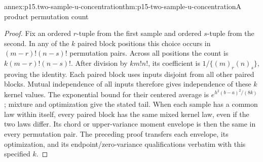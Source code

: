 \begin{annexitem}{annex:p15.two-sample-u-concentration}{thm:p15-two-sample-u-concentration}{A product permutation count}
\begin{proof}
Fix an ordered \(r\)-tuple from the first sample and ordered \(s\)-tuple
from the second. In any of the \(k\) paired block positions this choice
occurs in \((m-r)!(n-s)!\) permutation pairs. Across all positions the
count is \(k(m-r)!(n-s)!\). After division by \(k m!n!\), its coefficient is
\(1/\{(m)_r(n)_s\}\), proving the identity.
Each paired block uses inputs disjoint from all other paired blocks.
Mutual independence of all inputs therefore gives independence of
these \(k\) kernel values.
The exponential bound for their centered average is
\(e^{h^2(b-a)^2/(8k)}\); mixture and optimization give the stated tail.
When each sample has a common law within itself, every paired block
has the same mixed kernel law, even if the two laws differ.
Its chord or upper-variance moment envelope is then the same in
every permutation pair. The preceding proof transfers each envelope,
its optimization, and its endpoint/zero-variance qualifications verbatim
with this specified \(k\).
\end{proof}
\end{annexitem}

